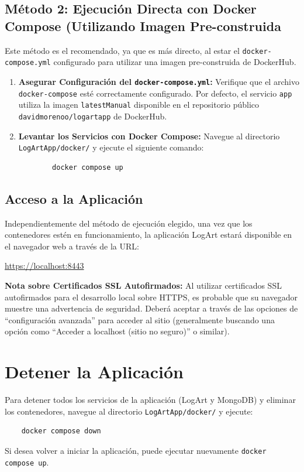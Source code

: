\subsection{Método 2: Ejecución Directa con Docker Compose (Utilizando Imagen Pre-construida}
\label{appA:ejecucionMetodo2}
Este método es el recomendado, ya que es más directo, al estar el \texttt{docker-compose.yml} configurado para utilizar una imagen pre-construida de DockerHub.
\begin{enumerate}
    \item \textbf{Asegurar Configuración del \texttt{docker-compose.yml}:}
    Verifique que el archivo \texttt{docker-compose} esté correctamente configurado. Por defecto, el servicio \texttt{app} utiliza la imagen \texttt{latestManual} disponible en el repositorio público \texttt{davidmorenoo/logartapp} de DockerHub.
    \item \textbf{Levantar los Servicios con Docker Compose:}
    Navegue al directorio \texttt{LogArtApp/docker/} y ejecute el siguiente comando:
    \begin{verbatim}
        docker compose up
    \end{verbatim}
\end{enumerate}

\subsection{Acceso a la Aplicación}
\label{appA:accesoApp}
Independientemente del método de ejecución elegido, una vez que los contenedores estén en funcionamiento, la aplicación LogArt estará disponible en el navegador web a través de la URL:
\begin{center}
    \url{https://localhost:8443}
\end{center}
\textbf{Nota sobre Certificados SSL Autofirmados:} Al utilizar certificados SSL autofirmados para el desarrollo local sobre HTTPS, es probable que su navegador muestre una advertencia de seguridad. Deberá aceptar a través de las opciones de ``configuración avanzada'' para acceder al sitio (generalmente buscando una opción como ``Acceder a localhost (sitio no seguro)'' o similar).

\section{Detener la Aplicación}
\label{appA:detenerApp}
Para detener todos los servicios de la aplicación (LogArt y MongoDB) y eliminar los contenedores, navegue al directorio \texttt{LogArtApp/docker/} y ejecute:
\begin{verbatim}
    docker compose down
\end{verbatim}
Si desea volver a iniciar la aplicación, puede ejecutar nuevamente \texttt{docker compose up}.

